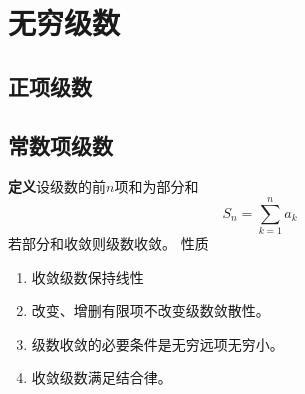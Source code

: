 \section{无穷级数}
\subsection{正项级数}
\subsection{常数项级数}
\textbf{定义}\quad 设级数的前$n$项和为部分和
\begin{equation}\label{key}
	S_n=\sum_{k=1}^{n}a_k
\end{equation}
若部分和收敛则级数收敛。
性质
\begin{enumerate}
	\item 收敛级数保持线性
	\item 改变、增删有限项不改变级数敛散性。
	\item 级数收敛的必要条件是无穷远项无穷小。
	\item 收敛级数满足结合律。
\end{enumerate}
